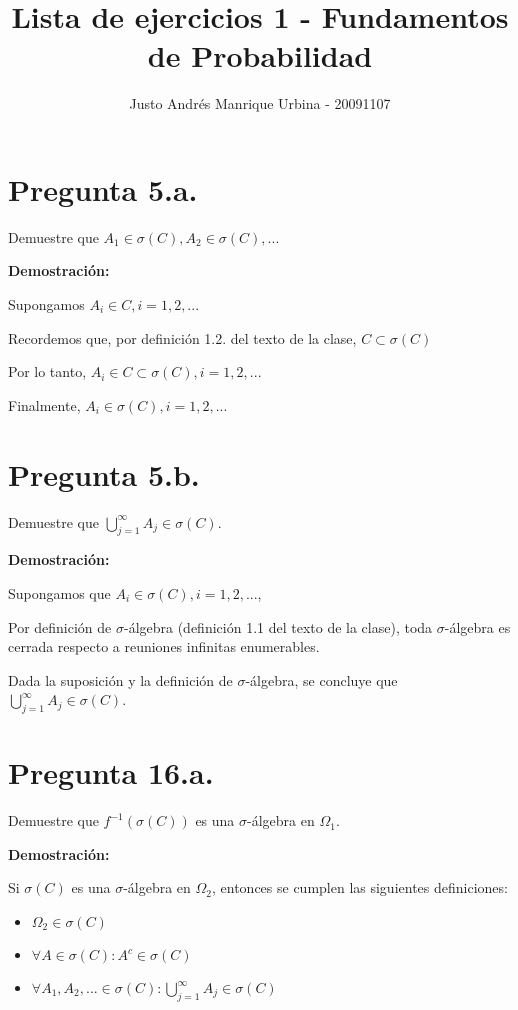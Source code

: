 \documentclass[11pt]{article}
\title{Lista de ejercicios 1 - Fundamentos de Probabilidad}
\begin{document}
\maketitle
\author{Justo Andrés Manrique Urbina - 20091107}

\section{Pregunta 5.a.}

Demuestre que $\mathit{A}_{1} \in \sigma(C), \mathit{A}_{2} \in \sigma(C), ...$

\textbf{Demostración:}

Supongamos $\mathit{A}_{i} \in C, i=1,2, ...$

Recordemos que, por definición 1.2. del texto de la clase, $C \subset \sigma(C)$

Por lo tanto, $\mathit{A}_{i} \in C \subset \sigma(C), i=1,2, ...$

Finalmente, $\mathit{A}_{i} \in \sigma(C), i=1,2, ...$

\section{Pregunta 5.b.}
Demuestre que $\bigcup^{\infty}_{j=1} A_{j} \in \sigma(C)$.

\textbf{Demostración:}

Supongamos que $\mathit{A}_{i} \in \sigma(C), i=1,2, ...$,

Por definición de $\sigma$-álgebra (definición 1.1 del texto de la clase), toda $\sigma$-álgebra es cerrada respecto a reuniones infinitas enumerables.

Dada la suposición y la definición de $\sigma$-álgebra, se concluye que  $\bigcup^{\infty}_{j=1} A_{j} \in \sigma(C)$.

\section{Pregunta 16.a.}
Demuestre que $\mathit{f}^{-1} (\sigma(C))$ es una $\sigma$-álgebra en $\Omega_{1}$.

\textbf{Demostración:}

Si $\sigma(C)$ es una $\sigma$-álgebra en $\Omega_{2}$, entonces se cumplen las siguientes definiciones:

\begin{itemize}
	\item $\Omega_{2} \in \sigma(C)$
	\item $\forall \mathit{A} \in \sigma(C): \mathit{A}^{c} \in \sigma(C)$
	\item $\forall \mathit{A}_{1},\mathit{A}_{2}, ... \in \sigma(C): \bigcup^{\infty}_{j=1} A_{j} \in \sigma(C)$
\end{itemize}
\end{document}
